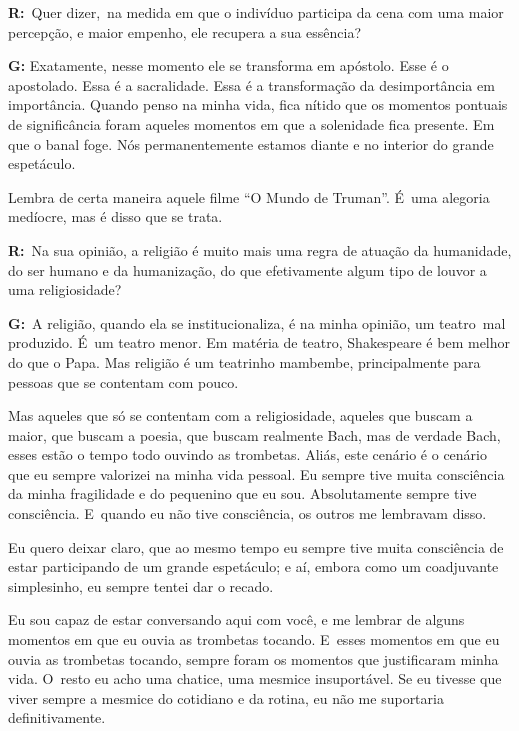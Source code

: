  

\textbf{R:}~Quer dizer,\textbf{}~na medida em que o indivíduo participa
da cena com uma maior percepção, e maior empenho, ele recupera a sua
essência?

 

\textbf{G:} Exatamente, nesse momento ele se transforma em apóstolo.
Esse é o apostolado. Essa é a sacralidade. Essa é a transformação da
desimportância em importância. Quando penso na minha vida, fica nítido
que os momentos pontuais de significância foram aqueles momentos em que
a solenidade fica presente. Em que o banal foge. Nós permanentemente
estamos diante e no interior do grande espetáculo.

 

Lembra de certa maneira aquele filme ``O Mundo de Truman''. É~uma
alegoria medíocre, mas é disso que se trata.

 

\textbf{R:}~Na sua opinião, a religião é muito mais uma regra de atuação
da humanidade, do ser humano e da humanização, do que efetivamente algum
tipo de louvor a uma religiosidade?

 

\textbf{G:}~A religião, quando ela se institucionaliza, é na minha
opinião, um teatro\textbf{}~mal produzido. É~um teatro menor. Em matéria
de teatro, Shakespeare é bem melhor do que o Papa. Mas religião é um
teatrinho mambembe, principalmente para pessoas que se contentam com
pouco.

 

Mas aqueles que só se contentam com a religiosidade, aqueles que buscam
a maior, que buscam a poesia, que buscam realmente Bach, mas de verdade
Bach, esses estão o tempo todo ouvindo as trombetas. Aliás, este cenário
é o cenário que eu sempre valorizei na minha vida pessoal. Eu sempre
tive muita consciência da minha fragilidade e do pequenino que eu sou.
Absolutamente sempre tive consciência. E~quando eu não tive consciência,
os outros me lembravam disso.

 

Eu quero deixar claro, que ao mesmo tempo eu sempre tive muita
consciência de estar participando de um grande espetáculo; e aí, embora
como um coadjuvante simplesinho, eu sempre tentei dar o recado.

 

Eu sou capaz de estar conversando aqui com você, e me lembrar de alguns
momentos em que eu ouvia as trombetas tocando. E~esses momentos em que
eu ouvia as trombetas tocando, sempre foram os momentos que justificaram
minha vida. O~resto eu acho uma chatice, uma mesmice insuportável. Se eu
tivesse que viver sempre a mesmice do cotidiano e da rotina, eu não me
suportaria definitivamente.

